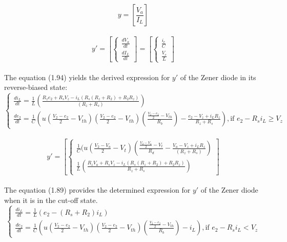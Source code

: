 \begin{equation}
    y=[\frac{V_a}{I_L}]
\end{equation}\\

\begin{equation}
    y'=[\begin{cases}
        \frac{dV_a}{dt}\\
        \frac{dI_L}{dt}
    \end{cases}]=[\begin{cases}
        \frac{i_c}{C}\\
        \frac{V_c}{L}
    \end{cases}]
\end{equation}\\

The equation (1.94) yields the derived expression for $y'$ of the Zener diode in its reverse-biased state:\\

\begin{equation}
    \begin{cases}
        \frac{di_L}{dt}=\frac{1}{L}(\frac{R_ze_2+R_sV_z-i_L(R_s(R_z+R_2)+R_2R_z)}{(R_z+R_s)})\\
        \frac{de_2}{dt}=\frac{1}{C}(u(\frac{V_2-e_2}{2}-V_{th})(\frac{V_2-e_2}{2}-V_{th})(\frac{\frac{V_2-e_2}{2}-V_{th}}{R_b})-\frac{e_2-V_z+i_LR_z}{R_z+R_s}),  \text{if } e_2-R_si_L \geq V_z
    \end{cases}
\end{equation}\\

\begin{equation}
    y'=[\begin{cases}
        \frac{1}{C}(u(\frac{V_2-V_a}{2}-V_t)(\frac{\frac{V_2-V_a}{2}-V_t}{R_d}-\frac{V_a-V_z+i_LR_z}{(R_z+R_s)})\\
        \frac{1}{L}(\frac{R_zV_a+R_sV_z-i_L(R_s(R_z+R_2)+R_2R_z)}{R_z+R_s})
    \end{cases}]
\end{equation}\\

The equation (1.89) provides the determined expression for $y'$ of the Zener diode when it is in the cut-off state.\\

\begin{equation}
    \begin{cases}
        \frac{di_L}{dt}=\frac{1}{L}(e_2-(R_s+R_2)i_L)\\
        \frac{de_2}{dt}=\frac{1}{C}\left(u\left(\frac{V_2-e_2}{2}-V_{th}\right)\left(\frac{V_2-e_2}{2}-V_{th}\right)\left(\frac{\frac{V_2-e_2}{2}-V_{th}}{R_b}\right)-i_L\right), \text{if } e_2-R_si_L<V_z
    \end{cases}
\end{equation}\\

